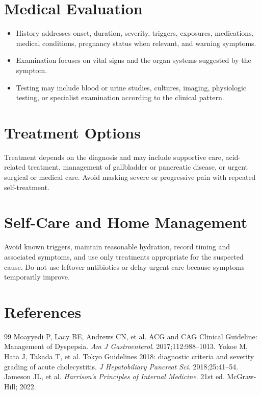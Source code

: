 \section*{Medical Evaluation}
\begin{itemize}
  \item History addresses onset, duration, severity, triggers, exposures, medications, medical conditions, pregnancy status when relevant, and warning symptoms.
  \item Examination focuses on vital signs and the organ systems suggested by the symptom.
  \item Testing may include blood or urine studies, cultures, imaging, physiologic testing, or specialist examination according to the clinical pattern.
\end{itemize}

\section*{Treatment Options}
Treatment depends on the diagnosis and may include supportive care, acid-related treatment, management of gallbladder or pancreatic disease, or urgent surgical or medical care. Avoid masking severe or progressive pain with repeated self-treatment.

\section*{Self-Care and Home Management}
Avoid known triggers, maintain reasonable hydration, record timing and associated symptoms, and use only treatments appropriate for the suspected cause. Do not use leftover antibiotics or delay urgent care because symptoms temporarily improve.

\section*{References}
\begin{thebibliography}{99}
 Moayyedi P, Lacy BE, Andrews CN, et al. ACG and CAG Clinical Guideline: Management of Dyspepsia. \textit{Am J Gastroenterol}. 2017;112:988--1013.
 Yokoe M, Hata J, Takada T, et al. Tokyo Guidelines 2018: diagnostic criteria and severity grading of acute cholecystitis. \textit{J Hepatobiliary Pancreat Sci}. 2018;25:41--54.
 Jameson JL, et al. \textit{Harrison's Principles of Internal Medicine}. 21st ed. McGraw-Hill; 2022.
\end{thebibliography}
